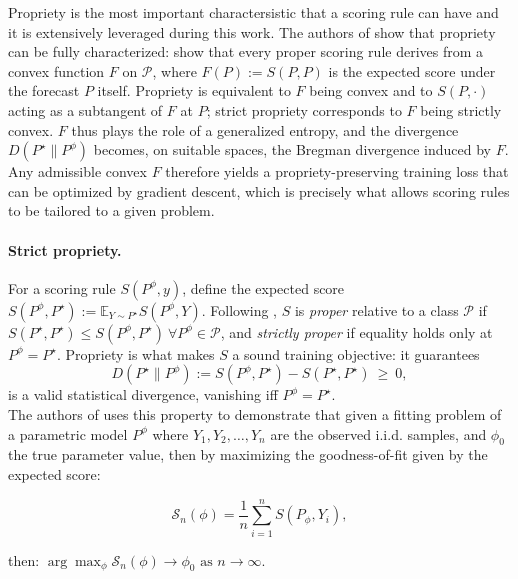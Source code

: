 Propriety is the most important charactersistic 
that a scoring rule can have and it is extensively leveraged during this work.
The authors of \cite{background:scoring_rules} show that propriety 
 can be fully characterized:
 \cite{background:scoring_rules} 
 show that every proper
 scoring rule derives
from a convex function $F$ on 
$\mathcal P$, where $F(P):=S(P,P)$ 
is the expected score under the forecast $P$ itself. 
Propriety is equivalent to $F$ being convex and 
to $S(P,\cdot)$ acting as a subtangent of 
$F$ at $P$; strict propriety corresponds 
to $F$ being strictly convex. $F$ 
thus plays the role of a generalized 
entropy, and the divergence $D(P^\star\|P^\phi)$ 
becomes, on suitable spaces, the 
Bregman divergence induced by $F$. 
Any admissible convex $F$ therefore 
yields a propriety-preserving training loss that can be optimized by gradient descent,
which is precisely what allows scoring rules 
to be tailored to a given problem.

\paragraph{Strict propriety.} 
For a scoring rule $S(P^\phi,y)$, 
define the expected score 
$S(P^\phi,P^\star):=\mathbb{E}_{Y\sim P^\star}S(P^\phi,Y)$. 
Following \cite{background:scoring_rules},
 $S$ is \emph{proper} relative to a class $\mathcal{P}$ 
 if $S(P^\star,P^\star)\le S(P^\phi,P^\star)\ \forall P^\phi\in\mathcal{P}$, 
 and \emph{strictly proper} if 
 equality holds only at $P^\phi=P^\star$. 
 Propriety is what makes $S$ a sound training 
 objective: it guarantees
$$D(P^\star\|P^\phi):=S(P^\phi,P^\star)-S(P^\star,P^\star)\ \ge\ 0,$$
is a valid statistical divergence, vanishing
iff $P^\phi=P^\star$.\\

The authors of \cite{background:scoring_rules} 
uses this property to demonstrate that given a fitting problem
of a parametric model $P^\phi$ where $Y_1, Y_2, \ldots, Y_n$ are the observed i.i.d. 
samples, and $\phi_0$ the true parameter value, then by 
maximizing the goodness-of-fit given by the expected score:

\begin{equation*}
    \mathcal{S}_n(\phi)=\frac{1}{n} \sum_{i=1}^n S\left(P_\phi, Y_i\right),
\end{equation*} 

then: $\arg \max _\phi \mathcal{S}_n(\phi) \rightarrow \phi_0 \text { as } n \rightarrow \infty$.\\



